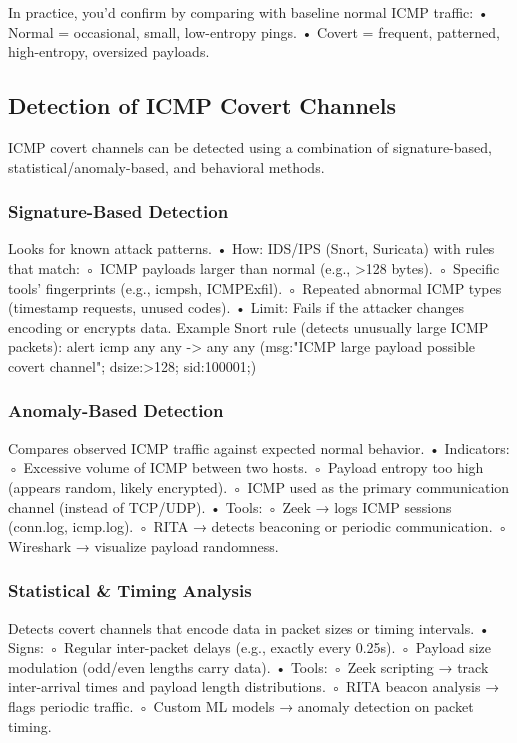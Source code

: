 In practice, you’d confirm by comparing with baseline normal ICMP traffic:
    • Normal = occasional, small, low-entropy pings.
    • Covert = frequent, patterned, high-entropy, oversized payloads.


\subsection{Detection of ICMP Covert Channels}
ICMP covert channels can be detected using a combination of signature-based, statistical/anomaly-based, and behavioral methods. 

\subsubsection{Signature-Based Detection}
Looks for known attack patterns.
    • How: IDS/IPS (Snort, Suricata) with rules that match:
        ◦ ICMP payloads larger than normal (e.g., >128 bytes).
        ◦ Specific tools’ fingerprints (e.g., icmpsh, ICMPExfil).
        ◦ Repeated abnormal ICMP types (timestamp requests, unused codes).
    • Limit: Fails if the attacker changes encoding or encrypts data.
%
Example Snort rule (detects unusually large ICMP packets):
alert icmp any any -> any any (msg:"ICMP large payload possible covert channel"; dsize:>128; sid:100001;)

\subsubsection{Anomaly-Based Detection}
Compares observed ICMP traffic against expected normal behavior.
    • Indicators:
        ◦ Excessive volume of ICMP between two hosts.
        ◦ Payload entropy too high (appears random, likely encrypted).
        ◦ ICMP used as the primary communication channel (instead of TCP/UDP).
    • Tools:
        ◦ Zeek → logs ICMP sessions (conn.log, icmp.log).
        ◦ RITA → detects beaconing or periodic communication.
        ◦ Wireshark → visualize payload randomness.

\subsubsection{Statistical \& Timing Analysis} 
Detects covert channels that encode data in packet sizes or timing intervals.
    • Signs:
        ◦ Regular inter-packet delays (e.g., exactly every 0.25s).
        ◦ Payload size modulation (odd/even lengths carry data).
    • Tools:
        ◦ Zeek scripting → track inter-arrival times and payload length distributions.
        ◦ RITA beacon analysis → flags periodic traffic.
        ◦ Custom ML models → anomaly detection on packet timing.

